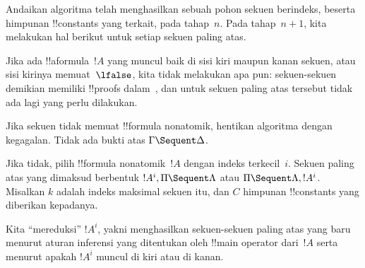 \documentclass[../../../include/open-logic-section]{subfiles}
\begin{document}
Andaikan algoritma telah menghasilkan sebuah pohon sekuen berindeks,
beserta himpunan !!{constant}s yang terkait, pada tahap~$n$. Pada
tahap~$n+1$, kita melakukan hal berikut untuk setiap sekuen paling atas.

Jika ada !!a{formula}~$!A$ yang muncul baik di sisi kiri maupun kanan
sekuen, atau sisi kirinya memuat~$\lfalse$, kita tidak melakukan apa pun:
sekuen-sekuen demikian memiliki !!{proof}s dalam~, dan untuk
sekuen paling atas tersebut tidak ada lagi yang perlu dilakukan.

Jika sekuen tidak memuat !!{formula} nonatomik, hentikan algoritma dengan
kegagalan. Tidak ada bukti atas $\Gamma \Sequent \Delta$.

Jika tidak, pilih !!{formula} nonatomik~$!A$ dengan indeks terkecil~$i$.
Sekuen paling atas yang dimaksud berbentuk $!A^i, \Pi \Sequent \Lambda$
atau $\Pi \Sequent \Lambda, !A^i$. Misalkan $k$ adalah indeks maksimal
sekuen itu, dan $C$ himpunan !!{constant}s yang diberikan kepadanya.

Kita ``mereduksi'' $!A^i$, yakni menghasilkan sekuen-sekuen paling
atas yang baru menurut aturan inferensi yang ditentukan oleh
!!{main operator} dari~$!A$ serta menurut apakah $!A^i$ muncul di kiri
atau di kanan.
\end{document}
